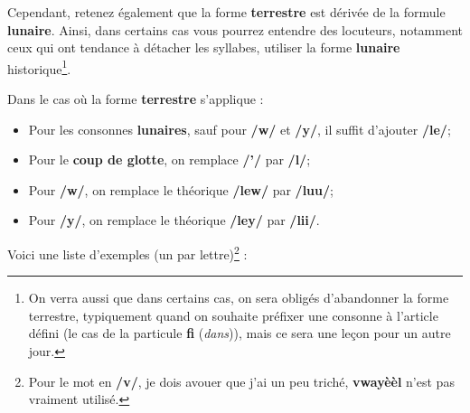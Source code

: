 Cependant, retenez également que la forme \textbf{terrestre} est dérivée de la formule \textbf{lunaire}. Ainsi, dans certains cas vous pourrez entendre des locuteurs, notamment ceux qui ont tendance à détacher les syllabes, utiliser la forme \textbf{lunaire} historique\footnote{On verra aussi que dans certains cas, on sera obligés d'abandonner la forme terrestre, typiquement quand on souhaite préfixer une consonne à l'article défini (le cas de la particule \textbf{fi} (\textit{dans})), mais ce sera une leçon pour un autre jour.}.

Dans le cas où la forme \textbf{terrestre} s'applique : 
\begin{itemize}
    \item Pour les consonnes \textbf{lunaires}, sauf pour \textbf{/w/} et \textbf{/y/}, il suffit d'ajouter \textbf{/le/};
    \item Pour le \textbf{coup de glotte}, on remplace \textbf{/'/} par \textbf{/l/};
    \item Pour \textbf{/w/}, on remplace le théorique \textbf{/lew/} par \textbf{/luu/};
    \item Pour \textbf{/y/}, on remplace le théorique \textbf{/ley/} par \textbf{/lii/}.
\end{itemize}\vspace{0.5cm}

Voici une liste d'exemples (un par lettre)\footnote{Pour le mot en \textbf{/v/}, je dois avouer que j'ai un peu triché, \textbf{vwayèèl} n'est pas vraiment utilisé.} : 

